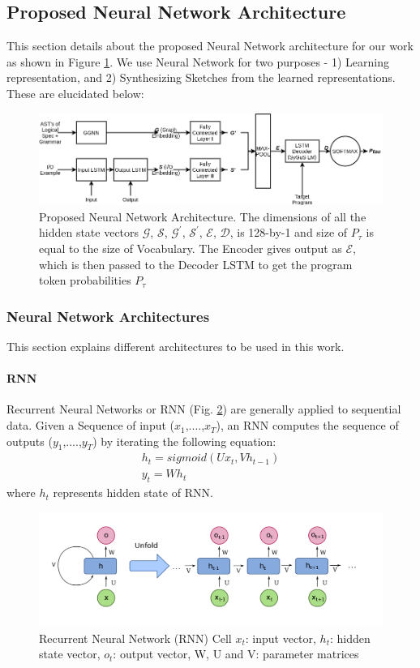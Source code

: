 \subsection{Proposed Neural Network Architecture}
This section details about the proposed Neural Network architecture for our work as shown in Figure \ref{fig:nna}. We use Neural Network for two purposes - 1) Learning representation, and 2) Synthesizing Sketches from the learned representations. These are elucidated below:

\begin{figure}
    \centering
    \includegraphics[scale=0.4]{NNA1.png}
    \caption{Proposed Neural Network Architecture. The dimensions of all the hidden state vectors $\mathcal{G}$,                 $\mathcal{S}$, $\mathcal{G^{'}}$, $\mathcal{S^{'}}$, $\mathcal{E}$, $\mathcal{D}$, is 128-by-1 and size of $P_\tau$ is       equal to the size of Vocabulary. The Encoder gives output as $\mathcal{E}$, which is then passed to the Decoder LSTM to     get the program token probabilities $P_\tau$}
    \label{fig:nna}
\end{figure}

\subsubsection{Neural Network Architectures}
This section explains different architectures to be used in this work.

\paragraph{RNN}
Recurrent Neural Networks or RNN (Fig. \ref{fig:rnn}) are generally applied to sequential data. Given a Sequence of input ($x_1$,....,$x_T$), an RNN computes the sequence of outputs ($y_1$,....,$y_T$) by iterating the following equation:
\begin{align*}
    h_t = sigmoid(U{x_t}, V{h_{t-1}})\\
    y_t = W{h_t}
\end{align*}
where $h_t$ represents hidden state of RNN.
\begin{figure}
    \centering
    \includegraphics[scale=0.2]{rnnunfolding.png}
    \caption{Recurrent Neural Network (RNN) Cell $x_t$: input vector, $h_t$: hidden state vector, $o_t$: output vector, W, U and V: parameter matrices}
    \label{fig:rnn}
\end{figure}

